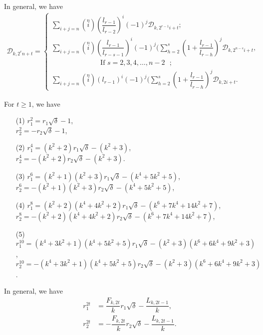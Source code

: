 In general, we have 
\begin{align*}
 \mathcal{D}_{k,{2^rn+t}}= \begin{cases}
\sum\limits_{i+j=n}\left( \stackrel{n}{i}\right)(\dfrac{l_{r-1}}{l_{r-2}})^i(-1)^j \mathcal{D}_{k,2^{r-1}i+t};\\
\sum\limits_{i+j=n}\left( \stackrel{n}{i}\right)(\dfrac{l_{r-1}}{l_{r-s-1}})^i(-1)^j (\sum_{h=2}^s(1+\dfrac{l_{r-1}}{l_{r-h}})^j\mathcal{D}_{k,2^{n-s}i+t}, \\\quad\quad\quad\quad\quad\quad\quad \text{If $s=2, 3, 4,\hdots, n-2 $ };\\\sum\limits_{i+j=n}\left( \stackrel{n}{i}\right)({l_{r-1}})^i(-1)^j (\sum_{h=2}^s(1+\dfrac{l_{r-1}}{l_{r-h}})^j\mathcal{D}_{k,2i+t}.
 \end{cases}
\end{align*}
 \begin{lemma}\label{3.12}
 For $t\geq 1$, we have
 \begin{enumerate}
 \item[(1)] $r_1^2=r_1\sqrt{\delta}-1$,\\
   $r_2^2=-r_2\sqrt{\delta}-1$,
   \item[(2)] $r_1^4=(k^2+2)r_1\sqrt{\delta}-(k^2+3)$,\\
   $r_2^4=-(k^2+2)r_2\sqrt{\delta}-(k^2+3)$.
    \item[(3)] $r_1^6=(k^2+1)(k^2+3)r_1\sqrt{\delta}-(k^4+5k^2+5)$,\\
   $r_2^6=-(k^2+1)(k^2+3)r_2\sqrt{\delta}-(k^4+5k^2+5)$,
    \item[(4)] $r_1^8=(k^2+2)(k^4+4k^2+2)r_1\sqrt{\delta}-(k^6+7k^4+14k^2+7)$,\\
   $r_2^8=-(k^2+2)(k^4+4k^2+2)r_2\sqrt{\delta}-(k^6+7k^4+14k^2+7)$,
   \item[(5)] $r_1^{10}=(k^4+3k^2+1)(k^4+5k^2+5)r_1\sqrt{\delta}-(k^2+3)(k^6+6k^4+9k^2+3)$,\\
   $r_2^{10}=-(k^4+3k^2+1)(k^4+5k^2+5)r_2\sqrt{\delta}-(k^2+3)(k^6+6k^4+9k^2+3)$.
    \end{enumerate}
    In general, we have
    \begin{align*}
    r_1^{2t}&=\dfrac{F_{k,2t}}{k}r_1\sqrt{\delta}-\dfrac{L_{k,2t-1}}{k},\\
    r_2^{2t}&=-\dfrac{F_{k,2t}}{k}r_2\sqrt{\delta}-\dfrac{L_{k,2t-1}}{k}.
    \end{align*}
     \end{lemma}
